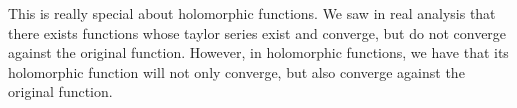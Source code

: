 \begin{remark}
  This is really special about holomorphic functions. We saw in real analysis
  that there exists functions whose taylor series exist and converge, but do not
  converge against the original function. However, in holomorphic functions, we
  have that its holomorphic function will not only converge, but also converge
  against the original function.
  \label{<+label+>}
\end{remark}
